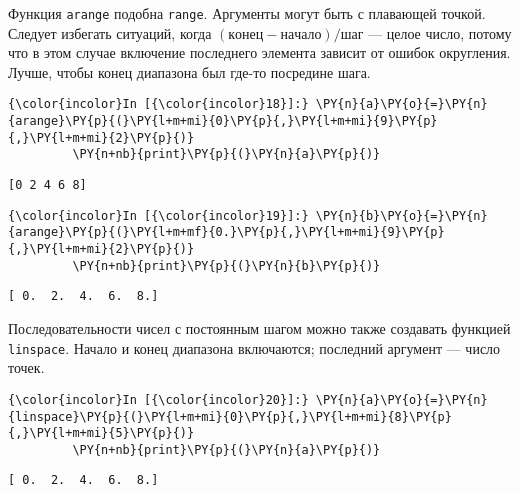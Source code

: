     Функция \texttt{arange} подобна \texttt{range}. Аргументы могут быть с
плавающей точкой. Следует избегать ситуаций, когда
\((конец-начало)/шаг\) --- целое число, потому что в этом случае включение
последнего элемента зависит от ошибок округления. Лучше, чтобы конец
диапазона был где-то посредине шага.

    \begin{Verbatim}[commandchars=\\\{\}]
{\color{incolor}In [{\color{incolor}18}]:} \PY{n}{a}\PY{o}{=}\PY{n}{arange}\PY{p}{(}\PY{l+m+mi}{0}\PY{p}{,}\PY{l+m+mi}{9}\PY{p}{,}\PY{l+m+mi}{2}\PY{p}{)}
         \PY{n+nb}{print}\PY{p}{(}\PY{n}{a}\PY{p}{)}
\end{Verbatim}

    \begin{Verbatim}[commandchars=\\\{\}]
[0 2 4 6 8]

    \end{Verbatim}

    \begin{Verbatim}[commandchars=\\\{\}]
{\color{incolor}In [{\color{incolor}19}]:} \PY{n}{b}\PY{o}{=}\PY{n}{arange}\PY{p}{(}\PY{l+m+mf}{0.}\PY{p}{,}\PY{l+m+mi}{9}\PY{p}{,}\PY{l+m+mi}{2}\PY{p}{)}
         \PY{n+nb}{print}\PY{p}{(}\PY{n}{b}\PY{p}{)}
\end{Verbatim}

    \begin{Verbatim}[commandchars=\\\{\}]
[ 0.  2.  4.  6.  8.]

    \end{Verbatim}

    Последовательности чисел с постоянным шагом можно также создавать
функцией \texttt{linspace}. Начало и конец диапазона включаются;
последний аргумент --- число точек.

    \begin{Verbatim}[commandchars=\\\{\}]
{\color{incolor}In [{\color{incolor}20}]:} \PY{n}{a}\PY{o}{=}\PY{n}{linspace}\PY{p}{(}\PY{l+m+mi}{0}\PY{p}{,}\PY{l+m+mi}{8}\PY{p}{,}\PY{l+m+mi}{5}\PY{p}{)}
         \PY{n+nb}{print}\PY{p}{(}\PY{n}{a}\PY{p}{)}
\end{Verbatim}

    \begin{Verbatim}[commandchars=\\\{\}]
[ 0.  2.  4.  6.  8.]

    \end{Verbatim}


